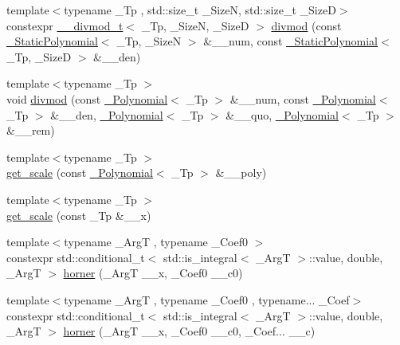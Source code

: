 \begin{DoxyCompactItemize}
\item 
{\footnotesize template$<$typename \+\_\+\+Tp , std\+::size\+\_\+t \+\_\+\+SizeN, std\+::size\+\_\+t \+\_\+\+SizeD$>$ }\\constexpr \hyperlink{struct____gnu__cxx_1_1____divmod__t}{\+\_\+\+\_\+divmod\+\_\+t}$<$ \+\_\+\+Tp, \+\_\+\+SizeN, \+\_\+\+SizeD $>$ \hyperlink{namespace____gnu__cxx_a33c585ec7ce2ac87e7f5cb1b1fe403b1}{divmod} (const \hyperlink{class____gnu__cxx_1_1__StaticPolynomial}{\+\_\+\+Static\+Polynomial}$<$ \+\_\+\+Tp, \+\_\+\+SizeN $>$ \&\+\_\+\+\_\+num, const \hyperlink{class____gnu__cxx_1_1__StaticPolynomial}{\+\_\+\+Static\+Polynomial}$<$ \+\_\+\+Tp, \+\_\+\+SizeD $>$ \&\+\_\+\+\_\+den)
\item 
{\footnotesize template$<$typename \+\_\+\+Tp $>$ }\\void \hyperlink{namespace____gnu__cxx_a84c52dc7c40b8b2731425e93db52903d}{divmod} (const \hyperlink{class____gnu__cxx_1_1__Polynomial}{\+\_\+\+Polynomial}$<$ \+\_\+\+Tp $>$ \&\+\_\+\+\_\+num, const \hyperlink{class____gnu__cxx_1_1__Polynomial}{\+\_\+\+Polynomial}$<$ \+\_\+\+Tp $>$ \&\+\_\+\+\_\+den, \hyperlink{class____gnu__cxx_1_1__Polynomial}{\+\_\+\+Polynomial}$<$ \+\_\+\+Tp $>$ \&\+\_\+\+\_\+quo, \hyperlink{class____gnu__cxx_1_1__Polynomial}{\+\_\+\+Polynomial}$<$ \+\_\+\+Tp $>$ \&\+\_\+\+\_\+rem)
\item 
{\footnotesize template$<$typename \+\_\+\+Tp $>$ }\\\hyperlink{namespace____gnu__cxx_a2af747c0e255f3fae4d9f118c2817e1a}{get\+\_\+scale} (const \hyperlink{class____gnu__cxx_1_1__Polynomial}{\+\_\+\+Polynomial}$<$ \+\_\+\+Tp $>$ \&\+\_\+\+\_\+poly)
\item 
{\footnotesize template$<$typename \+\_\+\+Tp $>$ }\\\hyperlink{namespace____gnu__cxx_a1a8bae104a6509f4e458d155acaf0476}{get\+\_\+scale} (const \+\_\+\+Tp \&\+\_\+\+\_\+x)
\item 
{\footnotesize template$<$typename \+\_\+\+ArgT , typename \+\_\+\+Coef0 $>$ }\\constexpr std\+::conditional\+\_\+t$<$ std\+::is\+\_\+integral$<$ \+\_\+\+ArgT $>$\+::value, double, \+\_\+\+ArgT $>$ \hyperlink{namespace____gnu__cxx_a2e77239e9d41f55a99755f285ba3d518}{horner} (\+\_\+\+ArgT \+\_\+\+\_\+x, \+\_\+\+Coef0 \+\_\+\+\_\+c0)
\item 
{\footnotesize template$<$typename \+\_\+\+ArgT , typename \+\_\+\+Coef0 , typename... \+\_\+\+Coef$>$ }\\constexpr std\+::conditional\+\_\+t$<$ std\+::is\+\_\+integral$<$ \+\_\+\+ArgT $>$\+::value, double, \+\_\+\+ArgT $>$ \hyperlink{namespace____gnu__cxx_a027e4b11b3b25078522220207c2d7f36}{horner} (\+\_\+\+ArgT \+\_\+\+\_\+x, \+\_\+\+Coef0 \+\_\+\+\_\+c0, \+\_\+\+Coef... \+\_\+\+\_\+c)

\end{DoxyCompactItemize}
